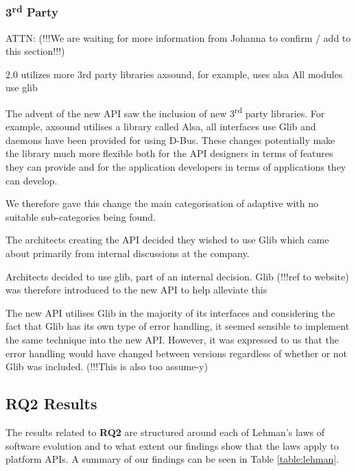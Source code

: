 \documentclass{sig-alternate}
\begin{document}
\subsubsection{3\textsuperscript{rd} Party}
ATTN: (!!!We are waiting for more information from Johanna to confirm / add to this section!!!)

2.0 utilizes more 3rd party libraries
axsound, for example, uses alsa
All modules use glib

The advent of the new API saw the inclusion of new 3\textsuperscript{rd} party libraries. For example, axsound utilises a library called Alsa, all interfaces use Glib and daemons have been provided for using D-Bus. These changes potentially make the library much more flexible both for the API designers in terms of features they can provide and for the application developers in terms of applications they can develop.

We therefore gave this change the main categorisation of adaptive with no suitable sub-categories being found.


The architects creating the API decided they wished to use Glib which came about primarily from internal discussions at the company.

Architects decided to use glib, part of an internal decision. 
Glib (!!!ref to website) was therefore introduced to the new API to help alleviate this 

The new API utilises Glib in the majority of its interfaces and considering the fact that Glib has its own type of error handling, it seemed sensible to implement the same technique into the new API. However, it was expressed to us that the error handling would have changed between versions regardless of whether or not Glib was included. (!!!This is also too assume-y)


\subsection{RQ2 Results} \label{results_rq2}
The results related to \textbf{RQ2} are structured around each of Lehman's laws of software evolution \cite{lehman1980programs} and to what extent our findings show that the laws apply to platform APIs. A summary of our findings can be seen in Table \ref{table:lehman}. 
\end{document}
